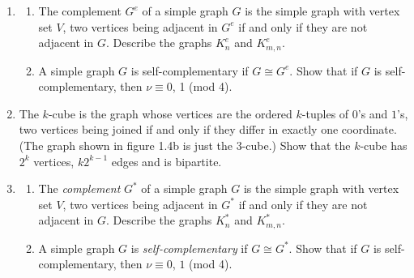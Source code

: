 \documentclass{article}
\theoremstyle{remark}
\begin{document}
\begin{enumerate}
        \item
        \begin{enumerate}
            \item The complement \( G^e \) of a simple graph \( G \) is the simple graph with vertex set \( V \), two vertices being adjacent in \( G^e \) if and only if they are not adjacent in \( G \). Describe the graphs \( K^e_n \) and \( K^e_{m,n} \).
            \item A simple graph \( G \) is self-complementary if \( G \cong G^e \). Show that if \( G \) is self-complementary, then \( \nu \equiv 0 \), 1 (mod 4).
        \end{enumerate}

        \item The \(k\)-cube is the graph whose vertices are the ordered \(k\)-tuples of \(0\)'s and \(1\)'s, two vertices being joined if and only if they differ in exactly one coordinate. (The graph shown in figure 1.4b is just the 3-cube.) Show that the \(k\)-cube has \(2^{k}\) vertices, \(k2^{k-1}\) edges and is bipartite.
    
        \item
        \begin{enumerate}
            \item The \emph{complement} \(G^{*}\) of a simple graph \(G\) is the simple graph with vertex set \(V\), two vertices being adjacent in \(G^{*}\) if and only if they are not adjacent in \(G\). Describe the graphs \(K_{n}^{*}\) and \(K_{m,n}^{*}\).
            \item A simple graph \(G\) is \emph{self-complementary} if \(G \cong G^{*}\). Show that if \(G\) is self-complementary, then \(\nu \equiv 0\), \(1\) (mod 4).
        \end{enumerate}
    

\end{enumerate}
\end{document}
